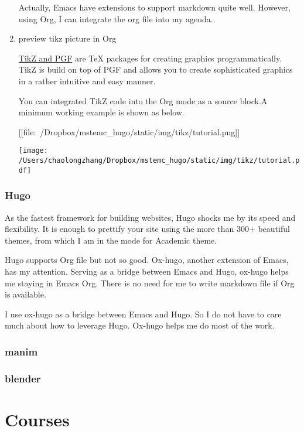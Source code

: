 \documentclass[koma,a4paper,utopia,10pt,listings-color,microtype,paralist,colorlinks]{org-article}
\begin{document}
\begin{enumerate}
Actually, Emacs have extensions to support markdown quite well. However, using
Org, I can integrate the org file into my agenda.


\item preview tikz picture in Org
\label{sec:org9816573}


\href{http://www.texample.net/tikz/}{TikZ and PGF} are \TeX{} packages for creating graphics programmatically. TikZ is
build on top of PGF and allows you to create sophisticated graphics in a rather
intuitive and easy manner.

You can integrated TikZ code into the Org mode as a source block.A minimum
working example is shown as below.

[[file:~/Dropbox/mstemc_hugo/static/img/tikz/tutorial.png]]


\begin{center}
\texttt{[image: /Users/chaolongzhang/Dropbox/mstemc\_hugo/static/img/tikz/tutorial.pdf]}
\end{center}
\end{enumerate}


\subsubsection{Hugo}
\label{sec:org65579c9}


As the fastest framework for building websites, Hugo shocks me by its speed and
flexibility. It is enough to prettify your site using the more than 300+
beautiful themes, from which I am in the mode for Academic theme.

Hugo supports Org file but not so good. Ox-hugo, another extension of Emacs, has
my attention. Serving as a bridge between Emacs and Hugo, ox-hugo helps me
staying in Emacs Org. There is no need for me to write markdown file if Org is
available.

I use ox-hugo as a bridge between Emacs and Hugo. So I do not have to care much
about how to leverage Hugo. Ox-hugo helps me do most of the work.

\subsubsection{manim}
\label{sec:orgbb047b1}



\subsubsection{blender}
\label{sec:orge8838d0}



\section{Courses}
\label{sec:orgfc25921}
\end{document}
